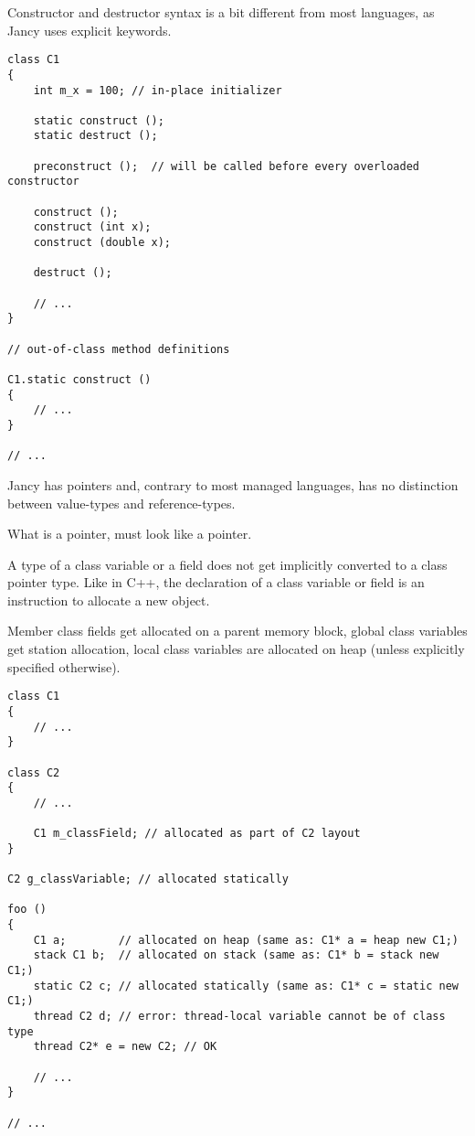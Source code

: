 \documentclass[oneside]{book}
\begin{document}
Constructor and destructor syntax is a bit different from most languages, as Jancy uses explicit keywords.

\begin{lstlisting}
class C1 
{
    int m_x = 100; // in-place initializer

    static construct ();
    static destruct ();

    preconstruct ();  // will be called before every overloaded constructor

    construct ();
    construct (int x);
    construct (double x);

    destruct ();

    // ...
}

// out-of-class method definitions

C1.static construct ()
{
    // ...
}

// ...
\end{lstlisting}

Jancy has pointers and, contrary to most managed languages, has no distinction between value-types and reference-types.

What is a pointer, must look like a pointer.

A type of a class variable or a field does not get implicitly converted to a class pointer type. Like in C++, the declaration of a class variable or field is an instruction to allocate a new object.

Member class fields get allocated on a parent memory block, global class variables get station allocation, local class variables are allocated on heap (unless explicitly specified otherwise).

\begin{lstlisting}
class C1 
{
    // ...
}

class C2
{
    // ...

    C1 m_classField; // allocated as part of C2 layout
}

C2 g_classVariable; // allocated statically

foo ()
{
    C1 a;        // allocated on heap (same as: C1* a = heap new C1;)
    stack C1 b;  // allocated on stack (same as: C1* b = stack new C1;)
    static C2 c; // allocated statically (same as: C1* c = static new C1;)
    thread C2 d; // error: thread-local variable cannot be of class type
    thread C2* e = new C2; // OK

    // ...
}

// ...
\end{lstlisting}
\end{document}
